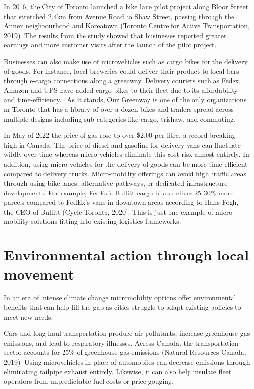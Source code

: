 \documentclass[letter]{ourGreenwayBrand}
\begin{document}
In 2016, the City of Toronto launched a bike lane pilot project along Bloor Street that stretched 2.4km from Avenue Road to Shaw Street, passing through the Annex neighbourhood and Koreatown (Toronto Centre for Active Transportation, 2019). The results from the study showed that businesses reported greater earnings and more customer visits after the launch of the pilot project.

Businesses can also make use of microvehicles such as cargo bikes for the delivery of goods. For instance, local breweries could deliver their product to local bars through e-cargo connections along a greenway. Delivery couriers such as Fedex, Amazon and UPS have added cargo bikes to their fleet due to its affordability and time-efficiency.  As it stands, Our Greenway is one of the only organizations in Toronto that has a library of over a dozen bikes and trailers spread across multiple designs including sub categories like cargo, trishaw, and commuting.

In May of 2022 the price of gas rose to over \$2.00 per litre, a record breaking high in Canada. The price of diesel and gasoline for delivery vans can fluctuate wildly over time whereas micro-vehicles eliminate this cost risk almost entirely. In addition, using micro-vehicles for the delivery of goods can be more time-efficient compared to delivery trucks. Micro-mobility offerings can avoid high traffic areas through using bike lanes, alternative pathways, or dedicated infrastructure developments. For example, FedEx’s Bullitt cargo bikes deliver 25-30\% more parcels compared to FedEx’s vans in downtown areas according to Hans Fogh, the CEO of Bullitt (Cycle Toronto, 2020). This is just one example of micro-mobility solutions fitting into existing logistics frameworks.

\section{Environmental action through local movement}
In an era of intense climate change micromobility options offer environmental benefits that can help fill the gap as cities struggle to adapt existing policies to meet new needs.

Cars and long-haul transportation produce air pollutants, increase greenhouse gas emissions, and lead to respiratory illnesses. Across Canada, the transportation sector accounts for 25\% of greenhouse gas emissions (Natural Resources Canada, 2019). Using microvehicles in place of automobiles can decrease emissions through eliminating tailpipe exhaust entirely. Likewise, it can also help insulate fleet operators from unpredictable fuel costs or price gouging.
\end{document}
